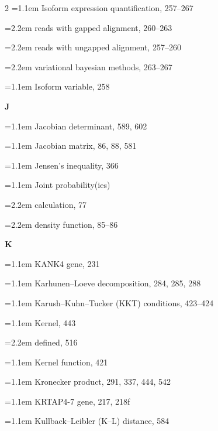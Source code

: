 \begin{multicols}{2}
\noindent\hangindent=1.1em Isoform expression quantification, 257--267\par
\noindent\hangindent=2.2em \hspace*{1.1em}reads with gapped alignment, 260--263\par
\noindent\hangindent=2.2em \hspace*{1.1em}reads with ungapped alignment, 257--260\par
\noindent\hangindent=2.2em \hspace*{1.1em}variational bayesian methods, 263--267\par
\noindent\hangindent=1.1em Isoform variable, 258\par

\par{}\medskip\noindent\textbf{J}\par\nobreak\smallskip\nobreak
\noindent\hangindent=1.1em Jacobian determinant, 589, 602\par
\noindent\hangindent=1.1em Jacobian matrix, 86, 88, 581\par
\noindent\hangindent=1.1em Jensen's inequality, 366\par
\noindent\hangindent=1.1em Joint probability(ies)\par
\noindent\hangindent=2.2em \hspace*{1.1em}calculation, 77\par
\noindent\hangindent=2.2em \hspace*{1.1em}density function, 85--86\par

\par{}\medskip\noindent\textbf{K}\par\nobreak\smallskip\nobreak
\noindent\hangindent=1.1em KANK4 gene, 231\par
\noindent\hangindent=1.1em Karhunen--Loeve decomposition, 284, 285, 288\par
\noindent\hangindent=1.1em Karush--Kuhn--Tucker (KKT) conditions, 423--424\par
\noindent\hangindent=1.1em Kernel, 443\par
\noindent\hangindent=2.2em \hspace*{1.1em}defined, 516\par
\noindent\hangindent=1.1em Kernel function, 421\par
\noindent\hangindent=1.1em Kronecker product, 291, 337, 444, 542\par
\noindent\hangindent=1.1em KRTAP4-7 gene, 217, 218f\par
\noindent\hangindent=1.1em Kullback--Leibler (K--L) distance, 584\par


\end{multicols}

